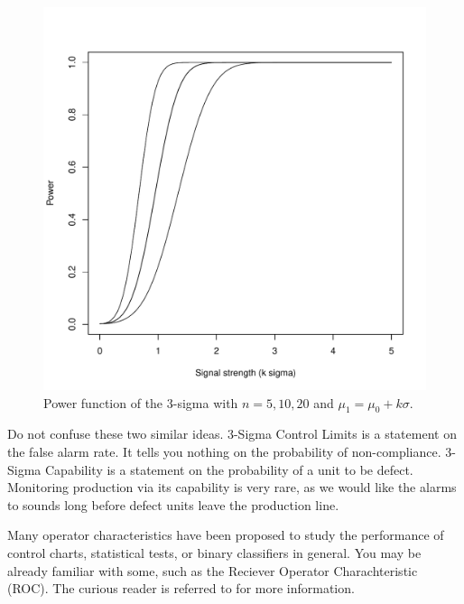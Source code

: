 \begin{figure}[h]
\centering
\includegraphics[height=0.3\textheight]{art/power_function.pdf}
\caption[Power Function]{Power function of the 3-sigma \barxChart with $n=5,10,20$ and $\mu_1=\mu_0 + k \sigma$.}
\label{fig:power_function}
\end{figure}

\begin{remark}
Do not confuse these two similar ideas.
3-Sigma Control Limits is a statement on the false alarm rate. It tells you nothing on the probability of non-compliance. 
3-Sigma Capability is a statement on the probability of a unit to be defect. 
Monitoring production via its capability is very rare, as we would like the alarms to sounds long before defect units leave the production line.
\end{remark}



\begin{extra}
Many operator characteristics have been proposed to study the performance of control charts, statistical tests, or binary classifiers in general.
You may be already familiar with some, such as the Reciever Operator Charachteristic (ROC). 
The curious reader is referred to \cite{wikipedia_receiver_2015} for more information.
\end{extra}


